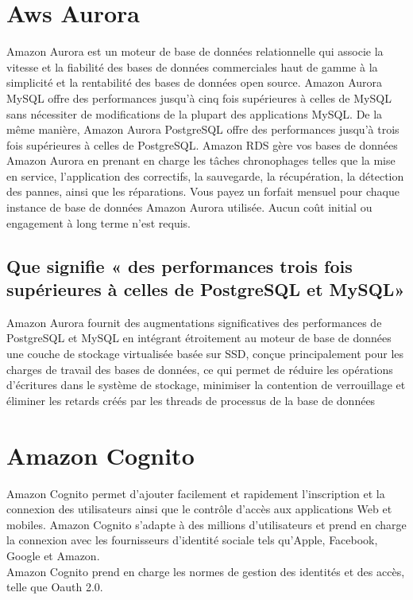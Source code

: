 \section{Aws Aurora}

Amazon Aurora est un moteur de base de données relationnelle qui associe la vitesse et la fiabilité des bases
de données commerciales haut de gamme à la simplicité et la rentabilité des bases de données open source.
Amazon Aurora MySQL offre des performances jusqu’à cinq fois supérieures à celles de MySQL sans
nécessiter de modifications de la plupart des applications MySQL. De la même manière, Amazon Aurora
PostgreSQL offre des performances jusqu’à trois fois supérieures à celles de PostgreSQL. Amazon RDS
gère vos bases de données Amazon Aurora en prenant en charge les tâches chronophages telles que la mise en service, l’application des correctifs, la sauvegarde, la récupération, la détection des pannes, ainsi que
les réparations. Vous payez un forfait mensuel pour chaque instance de base de données Amazon Aurora
utilisée. Aucun coût initial ou engagement à long terme n’est requis.

\subsection{Que signifie « des performances trois fois supérieures à celles de PostgreSQL  et MySQL» }
Amazon Aurora fournit des augmentations significatives des performances de PostgreSQL et  MySQL en intégrant étroitement au moteur de base de données une couche de stockage virtualisée basée sur SSD, conçue principalement pour les charges de travail des bases de données, ce qui permet de réduire les opérations d'écritures dans le système de stockage, minimiser la contention de verrouillage et éliminer les retards créés par les threads de processus de la base de données

\section{Amazon Cognito}
Amazon Cognito permet d’ajouter facilement et rapidement l’inscription et la connexion des utilisateurs ainsi que le contrôle d’accès aux applications Web et mobiles. Amazon Cognito s’adapte à des millions d’utilisateurs et prend en charge la connexion avec les fournisseurs d’identité sociale tels qu’Apple, Facebook, Google et Amazon.\\ Amazon Cognito prend en charge les normes de gestion des identités et des accès, telle que Oauth 2.0.

